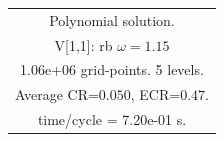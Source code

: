 \begin{table}[hbt]
\begin{center}
{\begin{tabular}{|c|c|c|c|c|}
\multicolumn{5}{|c|}{Polynomial solution.}  \\
\multicolumn{5}{|c|}{V[1,1]: rb $\omega=1.15$}  \\
\multicolumn{5}{|c|}{1.06e+06 grid-points. 5 levels.}  \\
\multicolumn{5}{|c|}{Average CR=$0.050$, ECR=$0.47$.}  \\
\multicolumn{5}{|c|}{time/cycle = 7.20e-01 s.}  \\
\hline 
\end{tabular}
}
\end{center}
\end{table}
